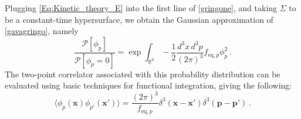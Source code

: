 \documentclass[aps,prd,preprint,nofootinbib,amsmath,amssymb,showpacs,longbibliography,singlecolumn,superscriptaddress,10pt]{revtex4-1}
\theoremstyle{plain}
\theoremstyle{definition}
\begin{document}
Plugging \eqref{Eq:Kinetic_theory_E} into the first line of \eqref{gringone}, and taking $\Sigma$ to be a constant-time hypersurface, we obtain the Gaussian approximation of \eqref{gavagringo}, namely
\begin{equation}\label{gavagringoGauss}
  \dfrac{\mathcal{P}[\phi_p]}{\mathcal{P}[\phi_p{=}0]} = \exp \int_{\mathbb{R}^6} - \dfrac{1}{2}\dfrac{d^3 x \, d^3p}{(2\pi)^3} f_{\text{eq},p}  \phi^2_p \, .
\end{equation}
The two-point correlator associated with this probability distribution can be evaluated using basic techniques for functional integration, giving the following:
\begin{equation}\label{equaltimecorreltor!}
    \langle \phi_p(\textbf{x})\phi_{p'}(\textbf{x}')\rangle = \dfrac{(2\pi)^3}{f_{\text{eq},p}} \delta^3(\textbf{x}-\textbf{x}')\delta^3(\textbf{p}-\textbf{p}') \, .
\end{equation}




\end{document}
